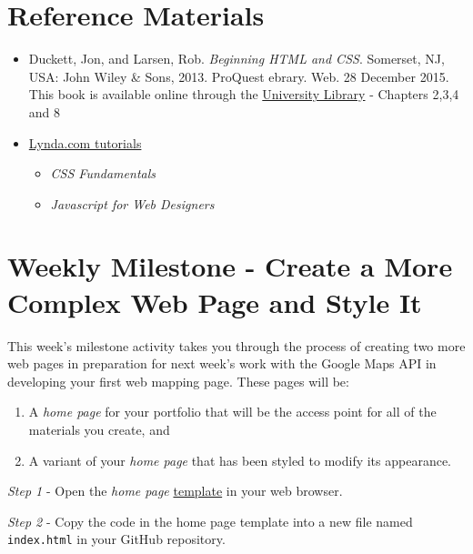 \documentclass[]{book}
\providecommand{\tightlist}{%
  \setlength{\itemsep}{0pt}\setlength{\parskip}{0pt}}
\begin{document}
\section{Reference Materials}\label{week02-reference}

\begin{itemize}
\item
  Duckett, Jon, and Larsen, Rob. \emph{Beginning HTML and CSS}.
  Somerset, NJ, USA: John Wiley \& Sons, 2013. ProQuest ebrary. Web. 28
  December 2015. This book is available online through the
  \href{http://site.ebrary.com.libproxy.unm.edu/lib/unma/detail.action?docID=10667426}{University
  Library} - Chapters 2,3,4 and 8
\item
  \href{http://www.lynda.com/SharedPlaylist/2b710369c9ec4d8c964467225c6610ad?org=unm.edu}{Lynda.com
  tutorials}

  \begin{itemize}
  \tightlist
  \item
    \emph{CSS Fundamentals}
  \item
    \emph{Javascript for Web Designers}
  \end{itemize}
\end{itemize}

\section{Weekly Milestone - Create a More Complex Web Page and Style
It}\label{week02-milestone}

This week's milestone activity takes you through the process of creating
two more web pages in preparation for next week's work with the Google
Maps API in developing your first web mapping page. These pages will be:

\begin{enumerate}
\def\labelenumi{\arabic{enumi}.}
\item
  A \emph{home page} for your portfolio that will be the access point
  for all of the materials you create, and
\item
  A variant of your \emph{home page} that has been styled to modify its
  appearance.
\end{enumerate}

\emph{Step 1} - Open the \emph{home page}
\href{https://raw.githubusercontent.com/UNM-GEOG-485-585/class-materials/master/sample-files/homePageTemplate.html}{template}
in your web browser.

\emph{Step 2} - Copy the code in the home page template into a new file
named \texttt{index.html} in your GitHub repository.
\end{document}
